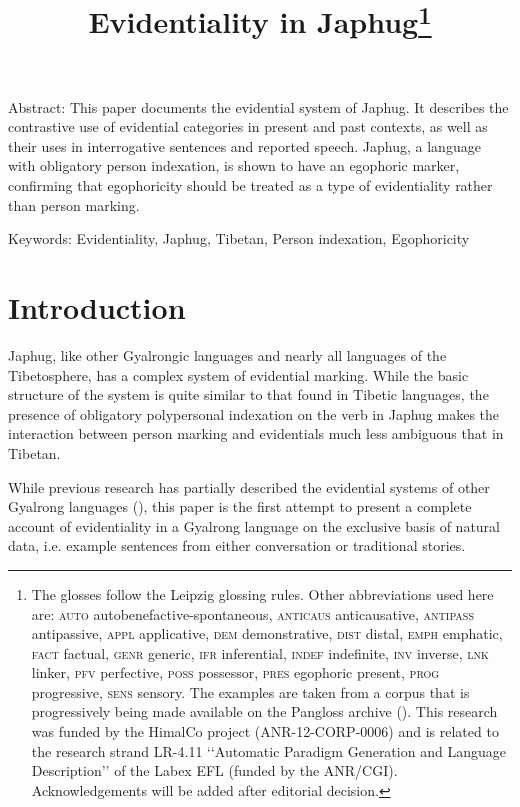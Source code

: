 \documentclass[oldfontcommands,oneside,a4paper,11pt]{article}
\begin{document}
 
\title{Evidentiality in Japhug\footnote{ The glosses follow the Leipzig glossing rules. Other abbreviations used here are: \textsc{auto}  autobenefactive-spontaneous, \textsc{anticaus} anticausative, \textsc{antipass} antipassive, \textsc{appl} applicative, \textsc{dem} demonstrative,  \textsc{dist} distal, \textsc{emph} emphatic, \textsc{fact} factual, \textsc{genr} generic, \textsc{ifr} inferential, \textsc{indef} indefinite, \textsc{inv} inverse,  \textsc{lnk} linker, \textsc{pfv} perfective, \textsc{poss} possessor, \textsc{pres} egophoric present, \textsc{prog} progressive, \textsc{sens} sensory. The examples are taken from a corpus that is progressively being made available on the Pangloss archive (\citealt{michailovsky14pangloss}). This research was funded by the HimalCo project (ANR-12-CORP-0006) and is related to the research strand LR-4.11 ‘‘Automatic Paradigm Generation and Language Description’’ of the Labex EFL (funded by the ANR/CGI). Acknowledgements   will be added after editorial decision. %
} }
\maketitle
\linenumbers

Abstract: This paper documents the evidential system of Japhug. It describes the contrastive use of evidential categories in present and past contexts, as well as their uses in interrogative sentences and reported speech. Japhug, a language with obligatory person indexation, is shown to have an egophoric marker, confirming that egophoricity should be treated as a type of evidentiality rather than person marking. 

Keywords: Evidentiality, Japhug, Tibetan, Person indexation, Egophoricity 

\section{Introduction}
Japhug, like other Gyalrongic languages and nearly all languages of the Tibetosphere, has a complex system of evidential marking. While the basic structure of the system is quite similar to that found in Tibetic languages, the presence of obligatory polypersonal indexation on the verb in Japhug makes the interaction between person marking and evidentials much less ambiguous that in Tibetan.

While previous research has partially described the evidential systems of other Gyalrong languages (\citealt{linyj03tense}), this paper is the first attempt to present a complete account of evidentiality in a Gyalrong language on the exclusive basis of natural data, i.e. example sentences from either conversation or traditional stories.
\end{document}
